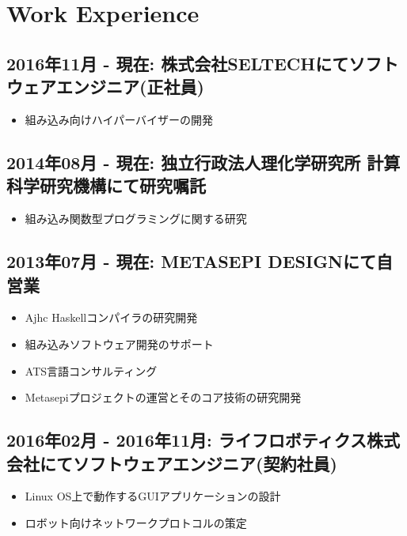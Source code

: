 \documentclass[letterpaper]{article}
\begin{document}
\section*{Work Experience}
\subsection*{2016年11月 - 現在: 株式会社SELTECHにてソフトウェアエンジニア(正社員)}

\begin{itemize}
  \item 組み込み向けハイパーバイザーの開発
\end{itemize}

\subsection*{2014年08月 - 現在: 独立行政法人理化学研究所 計算科学研究機構にて研究嘱託}

\begin{itemize}
  \item 組み込み関数型プログラミングに関する研究
\end{itemize}

\subsection*{2013年07月 - 現在: METASEPI DESIGNにて自営業}

\begin{itemize}
  \item Ajhc Haskellコンパイラの研究開発
  \item 組み込みソフトウェア開発のサポート
  \item ATS言語コンサルティング
  \item Metasepiプロジェクトの運営とそのコア技術の研究開発
\end{itemize}

\subsection*{2016年02月 - 2016年11月: ライフロボティクス株式会社にてソフトウェアエンジニア(契約社員)}

\begin{itemize}
  \item Linux OS上で動作するGUIアプリケーションの設計
  \item ロボット向けネットワークプロトコルの策定
\end{itemize}
\end{document}
